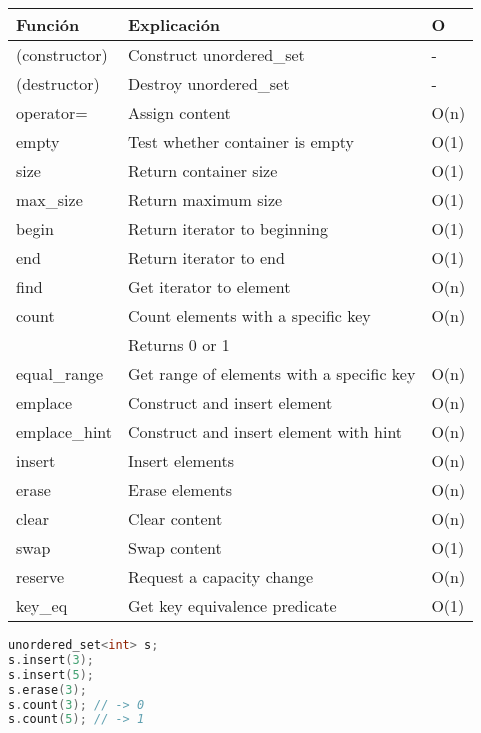 \begin{center}
    \begin{tabular}{||l|l|l||}
        \hline
        \textbf{Función}         & \textbf{Explicación}                               & \textbf{O} \\ \hline
        (constructor)            & Construct unordered\_set                          & -    \\ \hline
        (destructor)             & Destroy unordered\_set                            & -    \\ \hline
        operator=                & Assign content                                    & O(n) \\ \hline
        empty                    & Test whether container is empty                   & O(1) \\ \hline
        size                     & Return container size                             & O(1) \\ \hline
        max\_size                & Return maximum size                               & O(1) \\ \hline
        begin                    & Return iterator to beginning                      & O(1) \\ \hline
        end                      & Return iterator to end                            & O(1) \\ \hline
        find                     & Get iterator to element                           & O(n) \\ \hline
        count                    & Count elements with a specific key                & O(n) \\
                                 & Returns 0 or 1                                    & \\ \hline
        equal\_range             & Get range of elements with a specific key         & O(n) \\ \hline
        emplace                  & Construct and insert element                      & O(n) \\ \hline
        emplace\_hint            & Construct and insert element with hint            & O(n) \\ \hline
        insert                   & Insert elements                                   & O(n) \\ \hline
        erase                    & Erase elements                                    & O(n) \\ \hline
        clear                    & Clear content                                     & O(n) \\ \hline
        swap                     & Swap content                                      & O(1) \\ \hline
        reserve                  & Request a capacity change                         & O(n) \\ \hline
        key\_eq                  & Get key equivalence predicate                     & O(1) \\ \hline
    \end{tabular}
    \label{tab:set_member_functions_complexity}
\end{center}
\newpage

\begin{lstlisting}[language=C++]
unordered_set<int> s;
s.insert(3);
s.insert(5);
s.erase(3);
s.count(3); // -> 0
s.count(5); // -> 1
\end{lstlisting}
